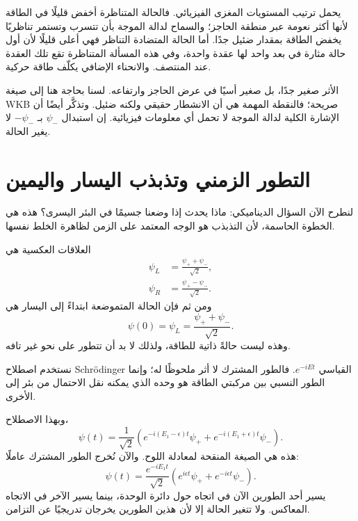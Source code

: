 يحمل ترتيب المستويات المغزى الفيزيائي. فالحالة المتناظرة أخفض قليلًا في الطاقة لأنها أكثر نعومة عبر منطقة الحاجز؛ والسماح لدالة الموجة بأن تتسرب وتستمر تناظريًا يخفض الطاقة بمقدار ضئيل جدًا. أما الحالة المتضادة التناظر فهي أعلى قليلًا لأن أول حالة مثارة في بعد واحد لها عقدة واحدة، وفي هذه المسألة المتناظرة تقع تلك العقدة عند المنتصف. والانحناء الإضافي يكلّف طاقة حركية.

الأثر صغير جدًا، بل صغير أسيًا في عرض الحاجز وارتفاعه. لسنا بحاجة هنا إلى صيغة WKB صريحة؛ فالنقطة المهمة هي أن الانشطار حقيقي ولكنه ضئيل. وتذكَّر أيضًا أن الإشارة الكلية لدالة الموجة لا تحمل أي معلومات فيزيائية. إن استبدال \(\psi_-\) بـ \(-\psi_-\) لا يغير الحالة.

\section{التطور الزمني وتذبذب اليسار واليمين}

لنطرح الآن السؤال الديناميكي: ماذا يحدث إذا وضعنا جسيمًا في البئر اليسرى؟ هذه هي الخطوة الحاسمة، لأن التذبذب هو الوجه المعتمد على الزمن لظاهرة الخلط نفسها.

العلاقات العكسية هي
\begin{align}
\psi_L &= \frac{\psi_+ + \psi_-}{\sqrt{2}},\\
\psi_R &= \frac{\psi_+ - \psi_-}{\sqrt{2}}.
\end{align}
ومن ثم فإن الحالة المتموضعة ابتداءً إلى اليسار هي
\begin{equation}
\psi(0)=\psi_L=\frac{\psi_+ + \psi_-}{\sqrt{2}}.
\end{equation}
وهذه ليست حالةً ذاتية للطاقة، ولذلك لا بد أن تتطور على نحو غير تافه.

نستخدم اصطلاح Schr\"odinger القياسي \(e^{-iEt}\). فالطور المشترك لا أثر ملحوظًا له؛ وإنما الطور النسبي بين مركبتي الطاقة هو وحده الذي يمكنه نقل الاحتمال من بئر إلى الأخرى.

وبهذا الاصطلاح،
\begin{equation}
\psi(t)=\frac{1}{\sqrt{2}}\left(e^{-i(E_1-\epsilon)t}\psi_+ + e^{-i(E_1+\epsilon)t}\psi_-\right).
\end{equation}
هذه هي الصيغة المنقحة لمعادلة اللوح. والآن نُخرج الطور المشترك عاملًا:
\begin{equation}
\psi(t)=\frac{e^{-iE_1 t}}{\sqrt{2}}\left(e^{i\epsilon t}\psi_+ + e^{-i\epsilon t}\psi_-\right).
\end{equation}
يسير أحد الطورين الآن في اتجاه حول دائرة الوحدة، بينما يسير الآخر في الاتجاه المعاكس. ولا تتغير الحالة إلا لأن هذين الطورين يخرجان تدريجيًا عن التزامن.

